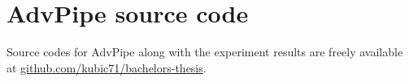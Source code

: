 \pagebreak
\section{AdvPipe source code}
Source codes for AdvPipe along with the experiment results are freely available at \href{https://github.com/kubic71/bachelors-thesis}{github.com/kubic71/bachelors-thesis}.




